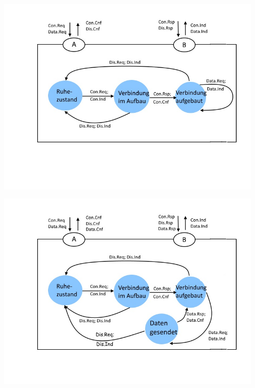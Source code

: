 \documentclass{../exercisesheet}
\begin{document}
\begin{exercise}{3.5}
	\begin{subexercise}
		\includegraphics[scale=0.7]{1_5a.jpg}
	\end{subexercise}

	\begin{subexercise}
		\includegraphics[scale=0.7]{1_5b.jpg}
	\end{subexercise}
\end{exercise}
\end{document}
